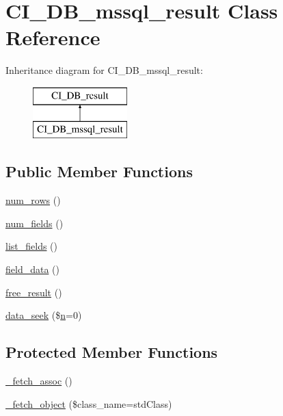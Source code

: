 \hypertarget{class_c_i___d_b__mssql__result}{}\section{C\+I\+\_\+\+D\+B\+\_\+mssql\+\_\+result Class Reference}
\label{class_c_i___d_b__mssql__result}
Inheritance diagram for C\+I\+\_\+\+D\+B\+\_\+mssql\+\_\+result\+:\begin{figure}[H]
\begin{center}
\leavevmode
\includegraphics[height=2.000000cm]{class_c_i___d_b__mssql__result}
\end{center}
\end{figure}
\subsection*{Public Member Functions}
\begin{DoxyCompactItemize}
\item 
\mbox{\hyperlink{class_c_i___d_b__mssql__result_a218657c303ee499b97710ab0cd2f5d6e}{num\+\_\+rows}} ()
\item 
\mbox{\hyperlink{class_c_i___d_b__mssql__result_af831bf363e4d7d661a717a4932af449d}{num\+\_\+fields}} ()
\item 
\mbox{\hyperlink{class_c_i___d_b__mssql__result_a50b54eb4ea7cfd039740f532988ea776}{list\+\_\+fields}} ()
\item 
\mbox{\hyperlink{class_c_i___d_b__mssql__result_a84bffd65e53902ade1591716749a33e3}{field\+\_\+data}} ()
\item 
\mbox{\hyperlink{class_c_i___d_b__mssql__result_aad2d98d6beb3d6095405356c6107b473}{free\+\_\+result}} ()
\item 
\mbox{\hyperlink{class_c_i___d_b__mssql__result_a8255ae91816e4206e29eb7581c5af0f1}{data\+\_\+seek}} (\$\mbox{\hyperlink{cli_2error__php_8php_a2e6b16bbc42094e4c51ade3c10afdcf1}{n}}=0)
\end{DoxyCompactItemize}
\subsection*{Protected Member Functions}
\begin{DoxyCompactItemize}
\item 
\mbox{\hyperlink{class_c_i___d_b__mssql__result_a43a9a92817f1334a1c10752ec44275a0}{\+\_\+fetch\+\_\+assoc}} ()
\item 
\mbox{\hyperlink{class_c_i___d_b__mssql__result_a60806be6a9c2488820813c2a7f4fef71}{\+\_\+fetch\+\_\+object}} (\$class\+\_\+name=\textquotesingle{}std\+Class\textquotesingle{})
\end{DoxyCompactItemize}

